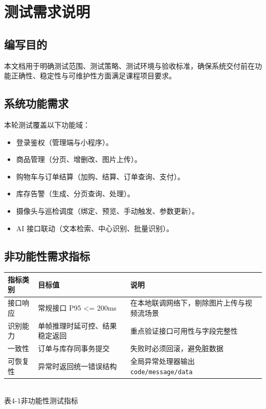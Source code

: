 \section{测试需求说明}

\subsection{编写目的}
本文档用于明确测试范围、测试策略、测试环境与验收标准，确保系统交付前在功能正确性、稳定性与可维护性方面满足课程项目要求。

\subsection{系统功能需求}
本轮测试覆盖以下功能域：
\begin{itemize}[leftmargin=2em]
  \item 登录鉴权（管理端与小程序）。
  \item 商品管理（分页、增删改、图片上传）。
  \item 购物车与订单结算（加购、结算、订单查询、支付）。
  \item 库存告警（生成、分页查询、处理）。
  \item 摄像头与巡检调度（绑定、预览、手动触发、参数更新）。
  \item AI 接口联动（文本检索、中心识别、批量识别）。
\end{itemize}

\subsection{非功能性需求指标}
\begin{center}
  \renewcommand{\arraystretch}{1.35}
  \begin{tabular}{|>{\centering\arraybackslash}m{2.8cm}|>{\centering\arraybackslash}m{4.0cm}|>{\centering\arraybackslash}m{5.4cm}|}
    \hline
    \textbf{指标类别} & \textbf{目标值} & \textbf{说明} \\ \hline
    接口响应 & 常规接口 P95 \textless= 200ms & 在本地联调网络下，剔除图片上传与视频流场景 \\ \hline
    识别能力 & 单帧推理时延可控、结果稳定返回 & 重点验证接口可用性与字段完整性 \\ \hline
    一致性 & 订单与库存同事务提交 & 失败时必须回滚，避免脏数据 \\ \hline
    可恢复性 & 异常时返回统一错误结构 & 全局异常处理器输出 \texttt{code/message/data} \\ \hline
  \end{tabular}
  \\[0.3em]
  {表4-1\quad 非功能性测试指标}
\end{center}

